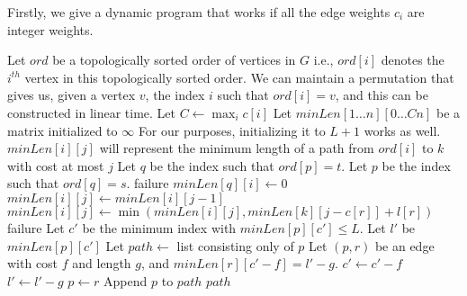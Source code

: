\documentclass[a4paper]{article}
\begin{document}
Firstly, we give a dynamic program that works if all the edge weights $c_i$ are integer weights.

\begin{algorithmic}[1]
        \State Let $ord$ be a topologically sorted order of vertices in $G$
        \State \Comment i.e., $ord[i]$ denotes the $i^{th}$ vertex in this topologically sorted order. We can maintain a permutation that gives us, given a vertex $v$, the index $i$ such that
        $ord[i] = v$, and this can be constructed in linear time.
        \State Let $C \gets \max_i c[i]$
        \State Let $minLen[1 \ldots n][0 \ldots Cn]$ be a matrix initialized to $\infty$
        \State \Comment For our purposes, initializing it to $L + 1$ works as well.
        \State \Comment $minLen[i][j]$ will represent the minimum length of a path from $ord[i]$ to $k$ with cost at most $j$
        \State Let $q$ be the index such that $ord[p] = t$.
        \State Let $p$ be the index such that $ord[q] = s$.
            \State \Return failure
        \EndIf
            \State $minLen[q][i] \gets 0$
        \EndFor
                    \State $minLen[i][j] \gets minLen[i][j - 1]$
                \EndIf
                    \State $minLen[i][j] \gets \min(minLen[i][j], minLen[k][j - c[r]] + l[r])$
                \EndFor
            \EndFor
        \EndFor
            \State \Return failure
        \EndIf
        \State Let $c'$ be the minimum index with $minLen[p][c'] \le L$.
        \State Let $l'$ be $minLen[p][c']$
        \State Let $path \gets$ list consisting only of $p$
            \State Let $(p, r)$ be an edge with cost $f$ and length $g$, and $minLen[r][c' - f] = l' - g$.
            \State $c' \gets c' - f$
            \State $l' \gets l' - g$
            \State $p \gets r$
            \State Append $p$ to $path$
        \EndWhile
        \State \Return $path$
    \EndFunction
\end{algorithmic}
\end{document}

